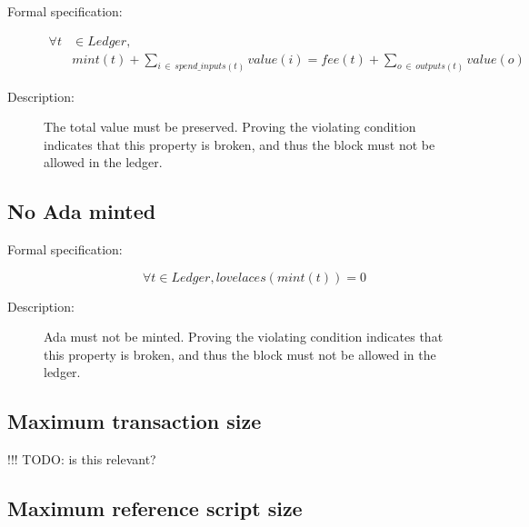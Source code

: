 \documentclass[../midgard.tex]{subfiles}
\begin{document}
\begin{description}

\item[Formal specification:]
\begin{equation*}
\begin{split}
    \forall t & \in Ledger, \\
    & mint(t) + \sum_{i \, \in \, spend\_inputs(t)} value(i) = fee(t) + \sum_{o \, \in \, outputs(t)} value(o)
\end{split}
\end{equation*}
        
\item[Description:] The total value must be preserved.
  Proving the violating condition indicates that this property is broken, and thus the block must not be allowed in the ledger.

\end{description}


\subsection{No Ada minted}
\label{rule:no-ada-minted}

\begin{description}

\item[Formal specification:]
\begin{equation*}
    \forall t \in Ledger, lovelaces(mint(t)) = 0
\end{equation*}
            
\item[Description:] Ada must not be minted.
  Proving the violating condition indicates that this property is broken, and thus the block must not be allowed in the ledger.
    
\end{description}

\subsection{Maximum transaction size}
\label{rule:maximum-transaction-size}

!!! TODO: is this relevant?

\subsection{Maximum reference script size}
\label{rule:maximum-reference-script-size}
\end{document}
